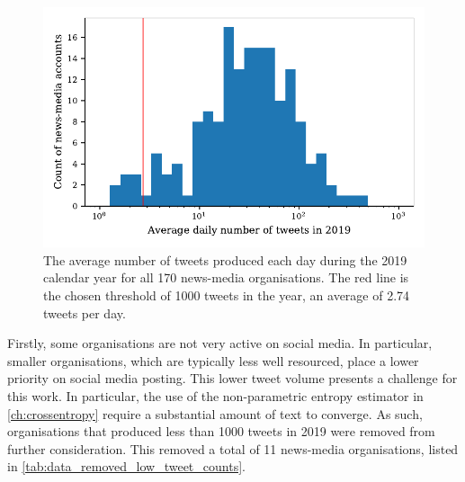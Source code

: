 \begin{figure}[!htbp]
	\centering
	\includegraphics{chapter1/figs/averagetweetactivity}
	\caption{The average number of tweets produced each day during the 2019 calendar year for all 170 news-media organisations. The red line is the chosen threshold of 1000 tweets in the year, an average of 2.74 tweets per day.}
	\label{fig:data_cleaning_average_tweet_activity}
\end{figure}

Firstly, some organisations are not very active on social media. In particular, smaller organisations, which are typically less well resourced, place a lower priority on social media posting. This lower tweet volume presents a challenge for this work. In particular, the use of the non-parametric entropy estimator in \autoref{ch:crossentropy} require a substantial amount of text to converge. As such, organisations that produced less than 1000 tweets in 2019 were removed from further consideration. This removed a total of 11 news-media organisations, listed in  \autoref{tab:data_removed_low_tweet_counts}.


